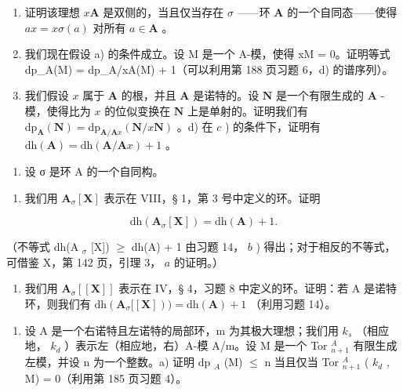 \begin{enumerate}
\def\labelenumi{\alph{enumi})}
\item
  证明该理想 \(x\mathbf{A}\) 是双侧的，当且仅当存在 \(\sigma\) ——环 \(\mathbf{A}\) 的一个自同态——使得 \(ax = x\sigma(a)\) 对所有 \(a \in \mathbf{A}\) 。
\item
  我们现在假设 a) 的条件成立。设 M 是一个 A-模，使得 xM = 0。证明等式 dp\_A(M) = dp\_{A/xA}(M) + 1（可以利用第 188 页习题 6，d) 的谱序列）。
\item
  我们假设 \(x\) 属于 \(\mathbf{A}\) 的根，并且 \(\mathbf{A}\) 是诺特的。设 \(\mathbf{N}\) 是一个有限生成的 \(\mathbf{A}\) -模，使得比为 \(x\) 的位似变换在 \(\mathbf{N}\) 上是单射的。证明我们有 \(\mathrm{dp}_{\mathbf{A}}(\mathbf{N}) = \mathrm{dp}_{\mathbf{A}/\mathbf{A}x}(\mathbf{N}/x\mathbf{N})\) 。d) 在 \(c\) ) 的条件下，证明有 \(\mathrm{dh}(\mathbf{A}) = \mathrm{dh}(\mathbf{A}/\mathbf{A}x) + 1\) 。
\end{enumerate}

\begin{enumerate}
\def\labelenumi{\arabic{enumi})}
\setcounter{enumi}{14}
\tightlist
\item
  设 σ 是环 A 的一个自同构。
\end{enumerate}

\begin{enumerate}
\def\labelenumi{\alph{enumi})}
\tightlist
\item
  我们用 \(\mathbf{A}_{\sigma}[\mathbf{X}]\) 表示在 VIII，§ 1，第 3 号中定义的环。证明
\end{enumerate}

\[
\mathrm{dh} (\mathbf {A} _ {\sigma} [ \mathbf {X} ]) = \mathrm{dh} (\mathbf {A}) + 1.
\]

（不等式 dh(A \(_{\sigma}\) {[}X{]}) \(\geqslant\) dh(A) + 1 由习题 14， \(b\) ) 得出；对于相反的不等式，可借鉴 X，第 142 页，引理 3， \(a\) 的证明。）

\begin{enumerate}
\def\labelenumi{\alph{enumi})}
\setcounter{enumi}{1}
\tightlist
\item
  我们用 \(\mathbf{A}_{\sigma}[[\mathbf{X}]]\) 表示在 IV，§ 4，习题 8 中定义的环。证明：若 A 是诺特环，则我们有 \(\mathrm{dh}(\mathbf{A}_{\sigma}[[\mathbf{X}]))=\mathrm{dh}(\mathbf{A})+1\) （利用习题 14）。
\end{enumerate}

\begin{enumerate}
\def\labelenumi{\arabic{enumi})}
\setcounter{enumi}{15}
\tightlist
\item
  设 A 是一个右诺特且左诺特的局部环，m 为其极大理想；我们用 \(k_{s}\) （相应地， \(k_{d}\) ）表示左（相应地，右）A-模 A/m。设 M 是一个 Tor \(_{n+1}^{A}\) 有限生成左模，并设 n 为一个整数。a) 证明 dp \(_{A}\) (M) \(\leqslant\) n 当且仅当 Tor \(_{n+1}^{A}\) ( \(k_{d}\) , M) = 0（利用第 185 页习题 4）。
\end{enumerate}

